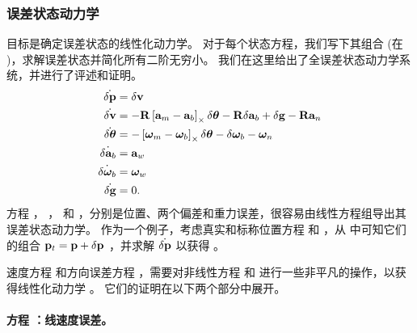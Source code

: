 \subsubsection{误差状态动力学}

目标是确定误差状态的线性化动力学。 
对于每个状态方程，我们写下其组合 (在 )，求解误差状态并简化所有二阶无穷小。 
我们在这里给出了全误差状态动力学系统，并进行了评述和证明。
%
\begin{subequations}\label{equ:efull}
%
\begin{align}
\dot{\delta{\bf p}} &= \delta{\bf v} \label{equ:epos}\\
\dot{\delta{\bf v}} &= -{\bf R}\left[{\bf a}_m-{\bf a}_b\right]_\times\delta{\bm \theta} - {\bf R}\delta{\bf a}_b + \delta{\bf g} - {\bf R}{\bf a}_n \label{equ:evel}\\
\dot{\delta{\bm \theta}} &= -\left[{\bm \omega}_m-{\bm \omega}_b\right]_\times\delta{\bm \theta} - \delta{\bm \omega}_b - {\bm \omega}_n \label{equ:equat}\\
\dot{\delta{\bf a}_b} &= {\bf a}_w \label{equ:eabias}\\
\dot{\delta{\bm \omega}_b} &= {\bm \omega}_w \label{equ:ewbias}\\
\dot{\delta{\bf g}} &= 0 .\label{equ:egrav}
\end{align}%
\end{subequations}
%
方程 ， ，  和 ，分别是位置、两个偏差和重力误差，很容易由线性方程组导出其误差状态动力学。 
作为一个例子，考虑真实和标称位置方程  和 ，从  中可知它们的组合 ${\bf p}_t={\bf p}+\delta{\bf p}$ ，并求解 $\dot{\delta {\bf p}}$ 以获得 。

速度方程  和方向误差方程 ，需要对非线性方程  和  进行一些非平凡的操作，以获得线性化动力学%
。 
它们的证明在以下两个部分中展开。


\paragraph{方程 ：线速度误差。}

